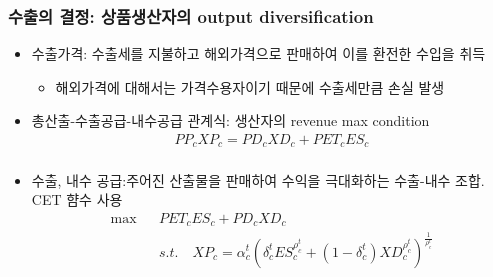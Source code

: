 \documentclass[10pt,compress,slidetop,%
			   hyperref={unicode},xcolor={svgnames},%
			   t]{beamer}
\begin{document}
\begin{frame}
	\frametitle{수출의 결정: 상품생산자의 output diversification }

\begin{itemize}
	\item{수출가격: 수출세를 지불하고 해외가격으로 판매하여 이를 환전한 수입을 취득}
		\begin{itemize}
		\item{해외가격에 대해서는 가격수용자이기 때문에 수출세만큼 손실 발생 }
		\end{itemize}
	\item{총산출-수출공급-내수공급 관계식: 생산자의 revenue max condition}
	\begin{eqnarray*}
 		PP_cXP_c=PD_cXD_c +PET_cES_c\\
	\end{eqnarray*}	
	\item{수출, 내수 공급:주어진 산출물을 판매하여 수익을 극대화하는 수출-내수 조합. CET 햠수 사용}
		\begin{eqnarray*}
\max& &PET_cES_c+PD_cXD_c\\ 
 & & s.t.\quad XP_c=\alpha^{t}_{c}(\delta^{t}_c ES^{\rho^{t}_c}_c + (1-\delta^{t}_c)XD^{\rho^{t}_c}_c)^{\frac{1}{\rho^{t}_c}}\\
    	\end{eqnarray*}
\end{itemize}
\end{frame}
\end{document}
